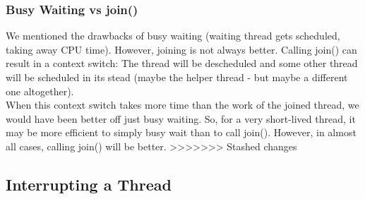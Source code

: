 \documentclass[main.tex]{subfiles}
\begin{document}
\subsubsection{Busy Waiting vs join()}
We mentioned the drawbacks of busy waiting (waiting thread gets scheduled, taking away CPU time). However, joining is not always better. Calling join() can result in a context switch: The thread will be descheduled and some other thread will be scheduled in its stead (maybe the helper thread - but maybe a different one altogether).\\
When this context switch takes more time than the work of the joined thread, we would have been better off just busy waiting. So, for a very short-lived thread, it may be more efficient to simply busy wait than to call join(). However, in almost all cases, calling join() will be better.
>>>>>>> Stashed changes

\subsection{Interrupting a Thread}
\end{document}
